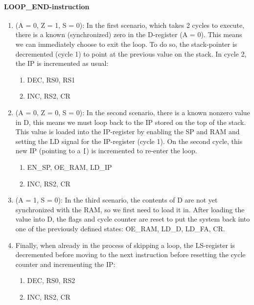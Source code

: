 \documentclass{article}
\begin{document}
  \paragraph{LOOP\_END-instruction}
  \begin{enumerate}
  \item (A = 0, Z = 1, S = 0): In the first scenario, which takes 2 cycles to execute, there is a known (synchronized) zero in the D-register (A = 0). This means we can immediately choose to exit the loop. To do so, the stack-pointer is decremented (cycle 1) to point at the previous value on the stack. In cycle 2, the IP is incremented as usual:
    \begin{enumerate}
    \item DEC, RS0, RS1  
    \item INC, RS2, CR
    \end{enumerate}

  \item (A = 0, Z = 0, S = 0): In the second scenario, there is a known nonzero value in D, this means we must loop back to the IP stored on the top of the stack. This value is loaded into the IP-register by enabling the SP and RAM and setting the LD signal for the IP-register (cycle 1). On the second cycle, this new IP (pointing to a \texttt{[}) is incremented to re-enter the loop.
      \begin{enumerate}
      \item EN\_SP, OE\_RAM, LD\_IP
      \item INC, RS2, CR
      \end{enumerate}
      
    \item (A = 1, S = 0): In the third scenario, the contents of D are not yet synchronized with the RAM, so we first need to load it in. After loading the value into D, the flags and cycle counter are reset to put the system back into one of the previously defined states: OE\_RAM, LD\_D, LD\_FA, CR.

    \item Finally, when already in the process of skipping a loop, the LS-register is decremented before moving to the next instruction before resetting the cycle counter and incrementing the IP:
      \begin{enumerate}
      \item DEC, RS0, RS2
      \item INC, RS2, CR
      \end{enumerate}
  \end{enumerate}
\end{document}
